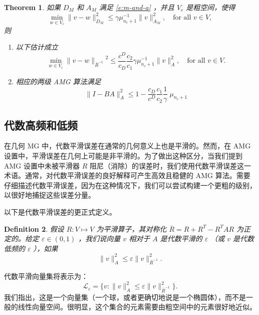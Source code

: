 \documentclass[12pt]{acta_2011xz}
\newcommand{\Tnorm}[1]{\ensuremath{\|#1\|_{\bar R^{-1}}}}
\newtheorem{theorem}{Theorem}[section]
\newtheorem{definition}[theorem]{Definition}
\begin{document}
   \begin{theorem}   \label{thm:quasi-opt}    如果    $D_M$    和    $A_M$    满足    \eqref{e:m-and-a}    ，并且    $V_c$    是粗空间，使得 
   \begin{equation}
        \min_{w\in V_c}\|v-w\|_{D_M}^2 \le \gamma\mu_{n_c+1}^{-1}\|v\|_{A_M}^2, \quad\mbox{for all } v\in V,
    \end{equation}    则
   \begin{enumerate}

   \item   以下估计成立
   \begin{equation}
        \min_{w\in V_c}\Tnorm{v-w}^2 \le \frac{c^D}{c_D}\frac{c_2}{c_1}\gamma \mu_{n_c+1}^{-1}\|v\|_A^2, \quad\mbox{for all } v\in V.
    \end{equation}      \item   相应的两级 AMG 算法满足
   \begin{equation}
    \label{2level-converge}
\|I-BA\|_A^2\le 1-    \frac{c_D}{c^D}\frac{c_1}{c_2}\frac{1}{\gamma}\;\mu_{n_c+1}
  \end{equation}     \end{enumerate}     \end{theorem}     

   \subsection{代数高频和低频  }       \label{s:hf-lf}     

在几何 MG 中，代数平滑误差在通常的几何意义上也是平滑的。然而，在 AMG 设置中，平滑误差在几何上可能是非平滑的。为了做出这种区分，当我们提到 AMG 设置中未被平滑器    $R$    阻尼（消除）的误差时，我们使用代数平滑误差这一术语。通常，对代数平滑误差的良好解释可产生高效且稳健的 AMG 算法。需要仔细描述代数平滑误差，因为在这种情况下，我们可以尝试构建一个更粗的级别，以很好地捕捉这些误差分量。  

以下是代数平滑误差的更正式定义。
   \begin{definition}   \label{def:smoothing}    假设    $R:V\mapsto V$    为平滑算子，其对称化
   $\overline{R}=R+R^T-R^TAR$    为正定的。给定    $\varepsilon
\in (0,1)$    ，我们说向量    $v$    相对于    $A$    是代数平滑的
   $\varepsilon$    （或    $v$    是代数低频的    $\varepsilon$    ），如果
   \begin{equation}\label{smoothing-1-norm} 
\|v\|_A^2\le \varepsilon\|v\|_{\bar{R}^{-1}}^2.
\end{equation}     \end{definition}    代数平滑向量集将表示为：
   \begin{equation} 
    \mathcal L_{\varepsilon} = \{  v: \|v\|_A^2\le \varepsilon\|v\|_{\bar{R}^{-1}}^2 \} .
\end{equation}    我们指出，这是一个向量集（一个球，或者更确切地说是一个椭圆体），而不是一般的线性向量空间。很明显，这个集合的元素需要由粗空间中的元素很好地近似。  
\end{document}
